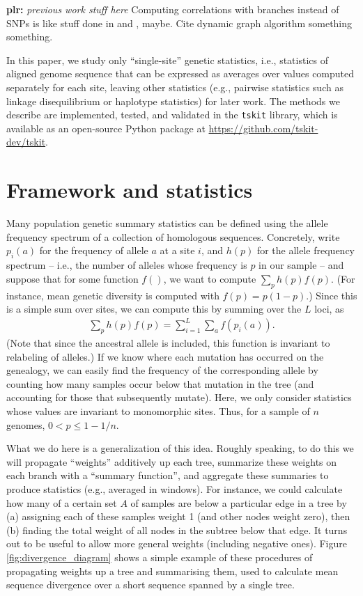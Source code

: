 \documentclass{article}
\newcommand{\tskit}{{\texttt{tskit}}}
\newcommand{\plr}[1]{{\color{blue}\textbf{plr:} \it #1}}
\begin{document}
\plr{previous work stuff here}
Computing correlations with branches instead of SNPs is like stuff done in \citet{zollner2005coalescent} and \citet{minichiello2006mapping}, maybe.
Cite dynamic graph algorithm something something.

In this paper, we study only ``single-site'' genetic statistics,
i.e., statistics of aligned genome sequence that can be expressed as averages over values computed
separately for each site,
leaving other statistics (e.g., pairwise statistics such as linkage disequilibrium
or haplotype statistics) for later work.
The methods we describe are implemented, tested, and validated in the \tskit{} library,
which is available as an open-source Python package at \url{https://github.com/tskit-dev/tskit}.


\section*{Framework and statistics}

Many population genetic summary statistics can be defined using the allele frequency spectrum
of a collection of homologous sequences.
Concretely, write $p_i(a)$ for the frequency of allele $a$ at a site $i$,
and $h(p)$ for the allele frequency spectrum
-- i.e., the number of alleles whose frequency is $p$ in our sample --
and suppose that for some function $f()$, we want to compute $\sum_p h(p) f(p)$.
(For instance, mean genetic diversity is computed with $f(p) = p (1-p)$.)
Since this is a simple sum over sites,
we can compute this by summing over the $L$ loci, as
\begin{align*}
    \sum_p h(p) f(p) = \sum_{i=1}^L \sum_a f(p_i(a)).
\end{align*}
(Note that since the ancestral allele is included, this function is invariant to relabeling of alleles.)
If we know where each mutation has occurred on the genealogy,
we can easily find the frequency of the corresponding allele by counting how many samples
occur below that mutation in the tree (and accounting for those that subsequently mutate).
Here, we only consider statistics whose values are invariant to monomorphic sites. Thus, for a sample of $n$
genomes, $0 < p \leq 1-1/n$.

What we do here is a generalization of this idea.
Roughly speaking, to do this we will
propagate ``weights'' additively up each tree,
summarize these weights on each branch with a ``summary function'',
and aggregate these summaries to produce statistics
(e.g., averaged in windows).
For instance, we could calculate how many of a certain set $A$ of samples
are below a particular edge in a tree
by (a) assigning each of these samples weight 1 (and other nodes weight zero), then
(b) finding the total weight of all nodes in the subtree below that edge.
It turns out to be useful to allow more general weights (including negative ones).
Figure \ref{fig:divergence_diagram} shows a simple example of these procedures
of propagating weights up a tree and summarising them,
used to calculate mean sequence divergence over a short sequence spanned by a single tree.
\end{document}
